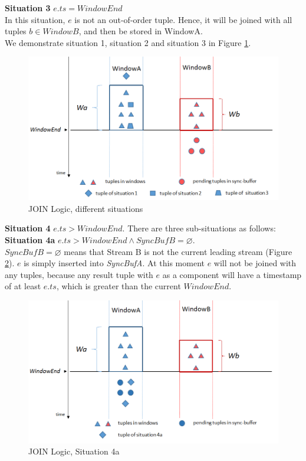 \documentclass[a4paper, 11pt, twoside]{report}
\let\emptyset\varnothing
\begin{document}
\noindent\textbf{Situation 3} $e.ts=WindowEnd$\\

In this situation, $e$ is not an out-of-order tuple. Hence, it will be joined with all tuples $b \in WindowB$, and then be stored in WindowA.\\

We demonstrate situation 1, situation 2 and situation 3 in Figure \ref{fig:join_logic_1}.\\

\begin{figure}[!htb]
\centering
\includegraphics[scale=0.55]{join_logic_1}
\caption{JOIN Logic, different situations\label{fig:join_logic_1}}
\end{figure}

\noindent\textbf{Situation 4} $e.ts>WindowEnd$. There are three sub-situations as follows:\\



\noindent\textbf{Situation 4a} $e.ts>WindowEnd \wedge SyncBufB=\emptyset$.\\

$SyncBufB=\emptyset$ means that Stream B is not the current leading stream (Figure \ref{fig:join_logic_2}). $e$ is simply inserted into \textit{SyncBufA}. At this moment $e$ will not be joined with any tuples, because any result tuple with $e$ as a component will have a timestamp of at least $e.ts$, which is greater than the current $WindowEnd$.\\

\begin{figure}[H]
\centering
\includegraphics[scale=0.55]{join_logic_2}
\caption{JOIN Logic, Situation 4a\label{fig:join_logic_2}}
\end{figure}
\end{document}
